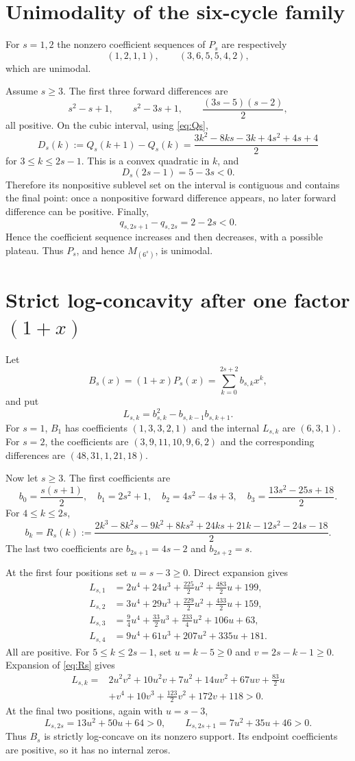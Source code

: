 \documentclass[11pt]{article}
\begin{document}
\section{Unimodality of the six-cycle family}
For $s=1,2$ the nonzero coefficient sequences of $P_s$ are respectively
\[
(1,2,1,1),\qquad (3,6,5,5,4,2),
\]
which are unimodal.

Assume $s\ge3$. The first three forward differences are
\[
s^2-s+1,\qquad s^2-3s+1,\qquad \frac{(3s-5)(s-2)}2,
\]
all positive. On the cubic interval, using \eqref{eq:Qs},
\begin{equation}
D_s(k):=Q_s(k+1)-Q_s(k)
=\frac{3k^2-8ks-3k+4s^2+4s+4}{2}
\label{eq:Ds}
\end{equation}
for $3\le k\le2s-1$. This is a convex quadratic in $k$, and
\[
D_s(2s-1)=5-3s<0.
\]
Therefore its nonpositive sublevel set on the interval is contiguous and contains the final point: once a nonpositive forward difference appears, no later forward difference can be positive. Finally,
\[
q_{s,2s+1}-q_{s,2s}=2-2s<0.
\]
Hence the coefficient sequence increases and then decreases, with a possible plateau. Thus $P_s$, and hence $M_{(6^s)}$, is unimodal.

\section{Strict log-concavity after one factor $(1+x)$}
Let
\[
B_s(x)=(1+x)P_s(x)=\sum_{k=0}^{2s+2}b_{s,k}x^k,
\]
and put
\[
L_{s,k}=b_{s,k}^2-b_{s,k-1}b_{s,k+1}.
\]
For $s=1$, $B_1$ has coefficients $(1,3,3,2,1)$ and the internal $L_{s,k}$ are $(6,3,1)$. For $s=2$, the coefficients are $(3,9,11,10,9,6,2)$ and the corresponding differences are $(48,31,1,21,18)$.

Now let $s\ge3$. The first coefficients are
\[
b_0=\frac{s(s+1)}2,\quad b_1=2s^2+1,\quad b_2=4s^2-4s+3,
\quad b_3=\frac{13s^2-25s+18}{2}.
\]
For $4\le k\le2s$,
\begin{equation}
b_k=R_s(k):=
\frac{2k^3-8k^2s-9k^2+8ks^2+24ks+21k-12s^2-24s-18}{2}.
\label{eq:Rs}
\end{equation}
The last two coefficients are $b_{2s+1}=4s-2$ and $b_{2s+2}=s$.

At the first four positions set $u=s-3\ge0$. Direct expansion gives
\begin{align*}
L_{s,1}&=2u^4+24u^3+\tfrac{225}2u^2+\tfrac{483}2u+199,\\
L_{s,2}&=3u^4+29u^3+\tfrac{229}2u^2+\tfrac{433}2u+159,\\
L_{s,3}&=\tfrac94u^4+\tfrac{33}2u^3+\tfrac{233}4u^2+106u+63,\\
L_{s,4}&=9u^4+61u^3+207u^2+335u+181.
\end{align*}
All are positive. For $5\le k\le2s-1$, set $u=k-5\ge0$ and $v=2s-k-1\ge0$. Expansion of \eqref{eq:Rs} gives
\begin{align*}
L_{s,k}={}&2u^2v^2+10u^2v+7u^2+14uv^2+67uv+\tfrac{83}2u\\
&+v^4+10v^3+\tfrac{123}2v^2+172v+118>0.
\end{align*}
At the final two positions, again with $u=s-3$,
\[
L_{s,2s}=13u^2+50u+64>0,
\qquad
L_{s,2s+1}=7u^2+35u+46>0.
\]
Thus $B_s$ is strictly log-concave on its nonzero support. Its endpoint coefficients are positive, so it has no internal zeros.
\end{document}
